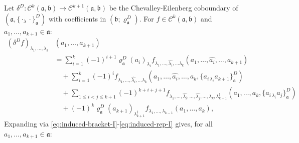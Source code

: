 \documentclass[a4paper,11pt]{article}
\def\Vs{\mathfrak{a}}
\def\Ws{\mathfrak{b}}
\def\rep{\varrho}
\def\Cch{\mathscr{C}}
\def\la{\lambda}
\numberwithin{equation}{section}
\begin{document}
Let $\delta^D:\Cch^k(\Vs,\Ws)\to\Cch^{k+1}(\Vs,\Ws)$ be the
Chevalley-Eilenberg coboundary of $(\Vs,\{\cdot_\la\cdot\}^D_\Vs)$
with coefficients in $(\Ws;\rep^D_\Vs)$.  For
$f\in\Cch^k(\Vs,\Ws)$ and $a_1,\ldots,a_{k+1}\in\Vs$:
\begin{equation}\label{eq:CE-D-I}
\begin{split}
  (\delta^D f)_{\la_1,\ldots,\la_k}
  &(a_1,\ldots,a_{k+1}) \\
  &= \sum_{i=1}^{k}(-1)^{i+1}
     \rep^D_\Vs(a_i)_{\la_i}
     f_{\la_1,\ldots,\widehat{\la_i},\ldots \la_k}(a_1,\ldots,\widehat{a_i},\ldots,a_{k+1})
     \\
  &\quad
    + \sum_{i=1}^{k}(-1)^i
    f_{\la_1,\ldots,\widehat{\la_i},\ldots \la_k}
      (a_1,\ldots,\widehat{a_i},\ldots,a_k,
       \{a_{i\,\la_i} a_{k+1}\}^D_\Vs)
      \\
  &\quad
    + \!\!\sum_{1\leq i<j\leq k+1}\!\!(-1)^{k+i+j+1}
      f_{\la_1,\ldots,\widehat{\la_i},\ldots ,\widehat{\la_j},\ldots, \la_k,\la_{k+1}^\ddag}
      (a_1,\ldots,a_k,\{a_{i\,\la_i}a_j\}^D_\Vs)
      \\
  &\quad
    + (-1)^k\rep^D_\Vs(a_{k+1})_{\la_{k+1}^\ddag}
      f_{\la_1,\ldots,\la_{k-1}}(a_1,\ldots,a_k),
\end{split}
\end{equation}
Expanding via \eqref{eq:induced-bracket-I}-\eqref{eq:induced-rep-I}
gives, for all $a_1,\ldots,a_{k+1}\in\Vs$:
\end{document}
